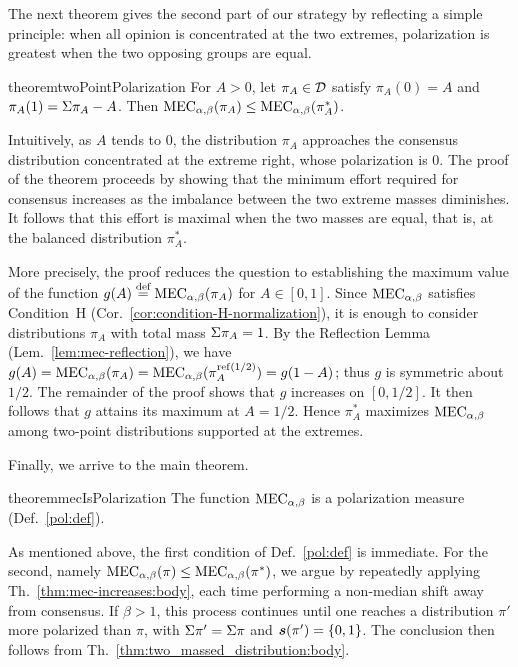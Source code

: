 The next theorem gives the second part of our strategy by reflecting a simple principle: when all opinion is concentrated at the two extremes, polarization is greatest when the two opposing groups are equal.

\begin{restatable}{theorem}{twoPointPolarization} \label{thm:two_massed_distribution:body}  For $A >0$, 
let \(\pi_A\in\mathcal{D}\) satisfy
\(\pi_A(0)=A\) and \(\pi_A(1)=\Sigma \pi_A-A\). Then  $\MEC(\pi_A) \leq  \MEC(\pi_A^*)$.
\end{restatable}
 
Intuitively, as $A$ tends to $0$, the distribution $\pi_A$ approaches the consensus distribution concentrated at the extreme right, whose polarization is $0$. The proof of the theorem proceeds by showing that the minimum effort required for consensus increases as the imbalance between the two extreme masses diminishes. It follows that this effort is maximal when the two masses are equal, that is, at the balanced distribution $\pi_A^*$.

More precisely, the proof reduces the question to establishing the maximum value of the function $g(A)\defsymbol \MEC(\pi_A)$ for $A\in[0,1]$. Since $\MEC$ satisfies Condition~H (Cor.~\ref{cor:condition-H-normalization}), it is enough to consider distributions $\pi_A$ with total mass $\Sigma \pi_A=1$. By the Reflection Lemma (Lem.~\ref{lem:mec-reflection}), we have $g(A)=\MEC(\pi_A)=\MEC(\pi_A^{\mathrm{ref}(1/2)})=g(1-A)$; thus $g$ is symmetric about $1/2$. The remainder of the proof shows that $g$ increases on $[0,1/2]$. It then follows that $g$ attains its maximum at $A=1/2$. Hence $\pi_A^*$ maximizes $\MEC$ among two-point distributions supported at the extremes.

Finally, we arrive to the main theorem.
\begin{restatable}{theorem}{mecIsPolarization}\label{th:mec-is-a-polarization-measure} The function $\MEC$ is a polarization measure (Def.~\ref{pol:def}).
\end{restatable}
As mentioned above, the first condition of Def.~\ref{pol:def} is immediate. For the second, namely $\MEC(\pi)\leq \MEC(\pi^*)$, we argue by repeatedly applying Th.~\ref{thm:mec-increases:body}, each time performing a non-median shift away from consensus. If $\beta>1$, this process continues until one reaches a distribution $\pi'$ more polarized than $\pi$, with $\Sigma \pi'=\Sigma \pi$ and $\boldsymbol{s}(\pi')=\{0,1\}$. The conclusion then follows from Th.~\ref{thm:two_massed_distribution:body}.

